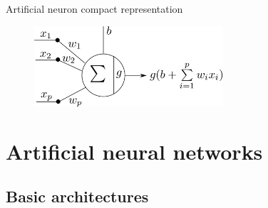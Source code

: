 \documentclass[xcolor=pdftex,dvipsnames,table,mathserif]{beamer}
\begin{document}
\begin{frame}{Artificial neuron compact representation}

    \begin{figure}
      \includegraphics[height=3cm]{neurone_representation_compacte}
    \end{figure}

\end{frame}

\section{Artificial neural networks}

\subsection{Basic architectures}

\end{document}
